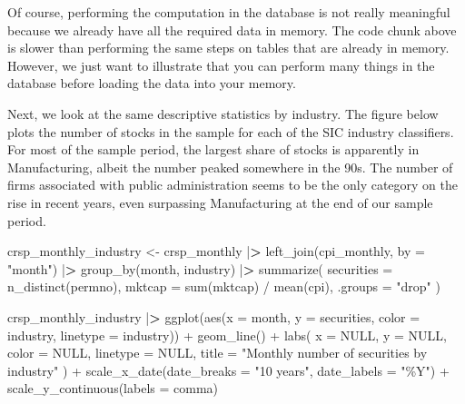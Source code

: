 \documentclass[
]{book}
\newenvironment{Shaded}{\begin{snugshade}}{\end{snugshade}}
\newcommand{\AttributeTok}[1]{\textcolor[rgb]{0.61,0.61,0.61}{#1}}
\newcommand{\ConstantTok}[1]{\textcolor[rgb]{0,0,0}{#1}}
\newcommand{\ErrorTok}[1]{\textcolor[rgb]{0.14,0.14,0.14}{\textbf{#1}}}
\newcommand{\FunctionTok}[1]{\textcolor[rgb]{0,0,0}{#1}}
\newcommand{\NormalTok}[1]{#1}
\newcommand{\OtherTok}[1]{\textcolor[rgb]{0.37,0.37,0.37}{#1}}
\newcommand{\SpecialCharTok}[1]{\textcolor[rgb]{0,0,0}{#1}}
\newcommand{\StringTok}[1]{\textcolor[rgb]{0.5,0.5,0.5}{#1}}
\begin{document}
Of course, performing the computation in the database is not really meaningful because we already have all the required data in memory. The code chunk above is slower than performing the same steps on tables that are already in memory. However, we just want to illustrate that you can perform many things in the database before loading the data into your memory.

Next, we look at the same descriptive statistics by industry. The figure below plots the number of stocks in the sample for each of the SIC industry classifiers. For most of the sample period, the largest share of stocks is apparently in Manufacturing, albeit the number peaked somewhere in the 90s. The number of firms associated with public administration seems to be the only category on the rise in recent years, even surpassing Manufacturing at the end of our sample period.

\begin{Shaded}
\begin{Highlighting}[]
\NormalTok{crsp\_monthly\_industry }\OtherTok{\textless{}{-}}\NormalTok{ crsp\_monthly }\SpecialCharTok{|}\ErrorTok{\textgreater{}}
  \FunctionTok{left\_join}\NormalTok{(cpi\_monthly, }\AttributeTok{by =} \StringTok{"month"}\NormalTok{) }\SpecialCharTok{|}\ErrorTok{\textgreater{}}
  \FunctionTok{group\_by}\NormalTok{(month, industry) }\SpecialCharTok{|}\ErrorTok{\textgreater{}}
  \FunctionTok{summarize}\NormalTok{(}
    \AttributeTok{securities =} \FunctionTok{n\_distinct}\NormalTok{(permno),}
    \AttributeTok{mktcap =} \FunctionTok{sum}\NormalTok{(mktcap) }\SpecialCharTok{/} \FunctionTok{mean}\NormalTok{(cpi),}
    \AttributeTok{.groups =} \StringTok{"drop"}
\NormalTok{  )}

\NormalTok{crsp\_monthly\_industry }\SpecialCharTok{|}\ErrorTok{\textgreater{}}
  \FunctionTok{ggplot}\NormalTok{(}\FunctionTok{aes}\NormalTok{(}\AttributeTok{x =}\NormalTok{ month, }
             \AttributeTok{y =}\NormalTok{ securities, }
             \AttributeTok{color =}\NormalTok{ industry, }
             \AttributeTok{linetype =}\NormalTok{ industry)) }\SpecialCharTok{+}
  \FunctionTok{geom\_line}\NormalTok{() }\SpecialCharTok{+}
  \FunctionTok{labs}\NormalTok{(}
    \AttributeTok{x =} \ConstantTok{NULL}\NormalTok{, }\AttributeTok{y =} \ConstantTok{NULL}\NormalTok{, }\AttributeTok{color =} \ConstantTok{NULL}\NormalTok{, }\AttributeTok{linetype =} \ConstantTok{NULL}\NormalTok{,}
    \AttributeTok{title =} \StringTok{"Monthly number of securities by industry"}
\NormalTok{  ) }\SpecialCharTok{+}
  \FunctionTok{scale\_x\_date}\NormalTok{(}\AttributeTok{date\_breaks =} \StringTok{"10 years"}\NormalTok{, }\AttributeTok{date\_labels =} \StringTok{"\%Y"}\NormalTok{) }\SpecialCharTok{+}
  \FunctionTok{scale\_y\_continuous}\NormalTok{(}\AttributeTok{labels =}\NormalTok{ comma)}
\end{Highlighting}
\end{Shaded}
\end{document}
